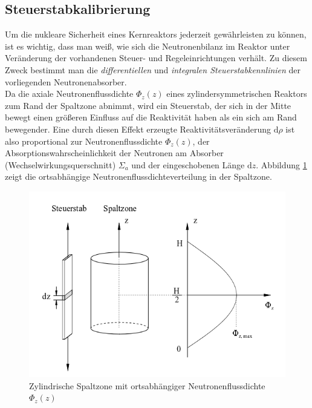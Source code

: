 	\subsection{Steuerstabkalibrierung}
	Um die nukleare Sicherheit eines Kernreaktors jederzeit gewährleisten zu können, ist es wichtig, dass man weiß, wie sich die Neutronenbilanz im Reaktor unter Veränderung der vorhandenen Steuer- und Regeleinrichtungen verhält. Zu diesem Zweck bestimmt man die \textit{differentiellen} und \textit{integralen Steuerstabkennlinien} der vorliegenden Neutronenabsorber. \\
	Da die axiale Neutronenflussdichte $\Phi_z(z)$ eines zylindersymmetrischen Reaktors zum Rand der Spaltzone abnimmt, wird ein Steuerstab, der sich in der Mitte bewegt einen größeren Einfluss auf die Reaktivität haben als ein sich am Rand bewegender. Eine durch diesen Effekt erzeugte Reaktivitätsveränderung $\mathrm{d}\rho$ ist also proportional zur Neutronenflussdichte $\Phi_z(z)$, der Absorptionswahrscheinlichkeit der Neutronen am Absorber (Wechselwirkungsquerschnitt) $\Sigma_a$ und der eingeschobenen Länge $\mathrm{d}z$. Abbildung \ref{int:NeutrFlDichte} zeigt die ortsabhängige Neutronenflussdichteverteilung in der Spaltzone.\\
		\begin{figure}[ht]
			\centering
			\captionsetup{justification=centering}
			\includegraphics[scale=0.4]{pic/NeutrFlDichte}
			\caption{Zylindrische Spaltzone mit ortsabhängiger Neutronenflussdichte $\Phi_z(z)$\cite{stab}}
			\label{int:NeutrFlDichte}
		\end{figure}
